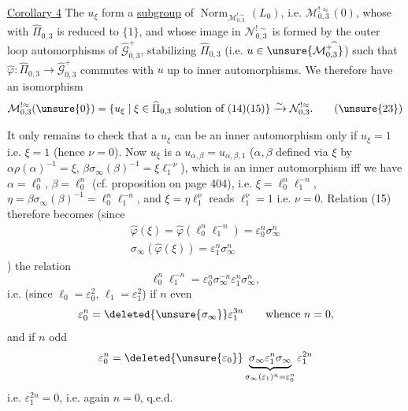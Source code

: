 \uline{Corollary 4} The $u_\xi$  form a \uline{subgroup} of $\operatorname{Norm}_{\mathcal M_{0,3}^{!\sim}}(L_0)$, i.e. $\mathcal M_{0,3}^{!\approx}(0)$, whose  with $\widehat\Pi_{0,3}$ is reduced to $\{1\}$, and whose image in $\mathcal N_{0,3}^{!\sim}$ is  formed by the outer loop automorphisms of $\widehat{\mathcal G}_{0,3}^{+}$, stabilizing $\widehat\Pi_{0,3}$ (i.e. $u\in\unsure{\mathcal M_{0,3}^{+\widehat{\ }}}$) such that $\widehat\varphi:\widehat\Pi_{0,3}\to\widehat{\mathcal G}_{0,3}^{+}$ commutes with $u$ up to inner automorphisms. We therefore have an isomorphism
\[
\mathcal M_{0,3}^{!\approx}(\unsure{0})
=\{u_\xi\mid \xi\in\widehat\Pi_{0,3}\text{ solution of }(14)(15)\}
\xrightarrow{\sim}\mathcal N_{0,3}^{!\approx}.
\tag{\unsure{23}}
\]


It only remains to check that a $u_\xi$ can be an inner automorphism only if $u_\xi=1$ i.e. $\xi=1$ (hence $\nu=0$). Now $u_\xi$ is a $u_{\alpha,\beta}=u_{\alpha,\beta,1}$ ($\alpha,\beta$ defined  via $\xi$ by $\alpha\rho(\alpha)^{-1}=\xi$, $\beta\sigma_\infty(\beta)^{-1}=\xi \ell_1^{-\nu}$), which is an inner automorphism iff we have $\alpha=\ell_0^n$, $\beta=\ell_0^n$ (cf. proposition on page 404), i.e. $\xi=\ell_0^n \ell_1^{-n}$, $\eta=\beta\sigma_\infty(\beta)^{-1}=\ell_0^n \ell_1^{-n}$, and   $\xi=\eta \ell_1^\nu$ reads $\ell_1^\nu=1$ i.e. $\nu=0$. Relation (15) therefore becomes (since
\[
\begin{gathered}
\widehat\varphi(\xi)=\widehat\varphi(\ell_0^n \ell_1^{-n})=\varepsilon_0^n\sigma_\infty^n\\
\sigma_\infty(\widehat\varphi(\xi))=\varepsilon_1^n\sigma_\infty^n
\end{gathered}
\]
)  the relation
\[
\ell_0^n \ell_1^{-n}=\varepsilon_0^n\sigma_\infty^{-n}\varepsilon_1^n\sigma_\infty^n,
\]
i.e. (since $\ell_0=\varepsilon_0^2$, $\ell_1=\varepsilon_1^2$) if $n$ even
\[
\varepsilon_0^n=\deleted{\unsure{\sigma_\infty}}\varepsilon_1^{3n}
\qquad\text{whence }n=0,
\]
and if $n$ odd
\[
\varepsilon_0^n=\deleted{\unsure{\varepsilon_0}}\underbrace{\sigma_\infty\varepsilon_1^n\sigma_\infty}_{\sigma_\infty(\varepsilon_1)^n=\varepsilon_0^n}\varepsilon_1^{2n}
\]
i.e. $\varepsilon_1^{2n}=0$, i.e. again $n=0$, q.e.d.


